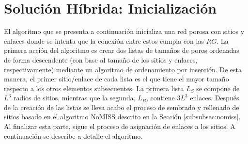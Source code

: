   
\section{Solución Híbrida: Inicializaci\'on}
\label{sec:hybrid}
El algoritmo que se presenta a continuación \cite{ref17} inicializa una red porosa con sitios y enlaces donde se intenta que 
la conexi\'on entre estos cumpla con las $RG$. La primera acción del algoritmo es crear dos listas de tamaños de poros ordenadas 
de forma descendente (con base al tamaño de los sitios y enlaces, respectivamente) mediante un algoritmo de ordenamiento por inserción. 
De esta manera, el primer sitio/enlace de cada lista es el que tiene el mayor tamaño respecto a los otros elementos subsecuentes.
La primera lista $L_S$ se compone de $L^3$ radios de sitios, mientras que la segunda, $L_B$, contiene $3L^3$ enlaces. Despu\'es de 
la creaci\'on de  las listas se lleva acabo el proceso de sembrado y rellenado de sitios basado en el algoritmo NoMISS descrito 
en la Sección \ref{subsubsec:nomiss}. Al finalizar esta parte, sigue el proceso de asignación de enlaces a los sitios. 
A continuación se describe a detalle el algoritmo.



